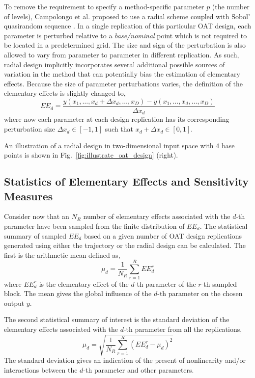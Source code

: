 To remove the requirement to specify a method-specific parameter $p$ (the number of levels),
Campolongo et al. proposed to use a radial scheme coupled with Sobol' quasirandom sequence \cite{Campolongo2011}.
In a single replication of this particular OAT design, 
each parameter is perturbed relative to a \textit{base/nominal} point 
which is not required to be located in a predetermined grid.
The size and sign of the perturbation is also allowed to vary from parameter to parameter in different replication.
As such, radial design implicitly incorporates several additional possible sources of variation in the method 
that can potentially bias the estimation of elementary effects.
Because the size of parameter perturbations varies, the definition of the elementary effects is slightly changed to,
\begin{equation}
EE_d = \frac{y(x_1, \dots, x_d+\Delta x_d,\dots,x_D) - y(x_1, \dots, x_d,\dots,x_D)}{\Delta x_d}
\end{equation}
where now each parameter at each design replication has its corresponding perturbation size $\Delta x_d \in [-1,1]$ such that $x_d + \Delta x_d \in [0,1]$.

An illustration of a radial design in two-dimensional input space with $4$ base points is shown in Fig.~\ref{fig:illustrate_oat_design} (right).
 
\subsection{Statistics of Elementary Effects and Sensitivity Measures}

Consider now that an $N_R$ number of elementary effects associated with the $d$-th parameter have been sampled from the finite distribution of $EE_d$.
The statistical summary of sampled $EE_d$ based on a given number of OAT design replications generated using either the trajectory or the radial design can be calculated.
The first is the arithmetic mean defined as,
\begin{equation}
	\mu_d = \frac{1}{N_R} \sum_{r = 1}^{R} EE^r_d
	\label{eq:sa_morris_mu}
\end{equation} 
where $EE^r_d$ is the elementary effect of the $d$-th parameter of the $r$-th sampled block.
The mean gives the global influence of the $d$-th parameter on the chosen output $y$.

The second statistical summary of interest is the standard deviation of the elementary effects associated with the $d$-th parameter from all the replications,
\begin{equation}
	\mu_d = \sqrt{\frac{1}{N_R} \sum_{r = 1}^{R} (EE^r_d - \mu_d)^2}
	\label{eq:sa_morris_sd}
\end{equation} 
The standard deviation gives an indication of the present of nonlinearity and/or interactions between the $d$-th parameter and other parameters.

